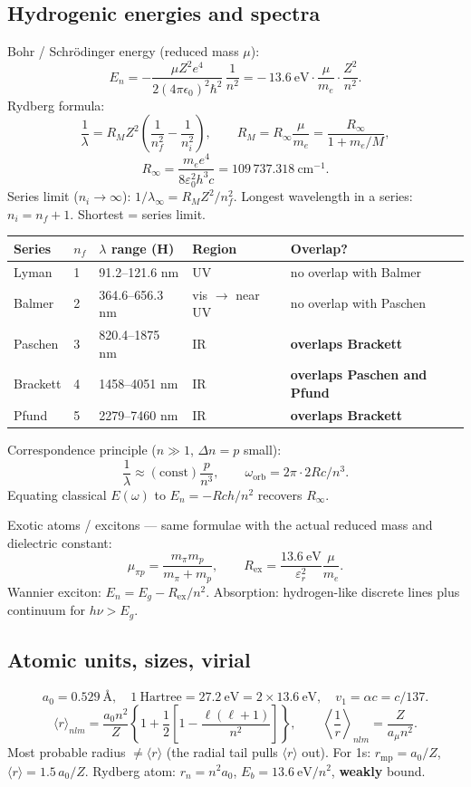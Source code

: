 \documentclass[11pt,a4paper]{article}
\begin{document}
\subsection{Hydrogenic energies and spectra}

Bohr / Schr\"odinger energy (reduced mass \(\mu\)):
\[
E_n = -\frac{\mu Z^2 e^4}{2(4\pi\epsilon_0)^2\hbar^2}\,\frac{1}{n^2}
= -\,13.6~\mathrm{eV}\cdot\frac{\mu}{m_e}\cdot\frac{Z^2}{n^2}.
\]
Rydberg formula:
\[
\frac{1}{\lambda} = R_M Z^2\left(\frac{1}{n_f^2}-\frac{1}{n_i^2}\right),\qquad
R_M = R_\infty\frac{\mu}{m_e} = \frac{R_\infty}{1+m_e/M},
\]
\[
R_\infty = \frac{m_e e^4}{8\varepsilon_0^2 h^3 c} = 109\,737.318~\mathrm{cm}^{-1}.
\]
Series limit (\(n_i\to\infty\)): \(1/\lambda_\infty = R_M Z^2/n_f^2\).
Longest wavelength in a series: \(n_i=n_f+1\). Shortest = series limit.

\begin{center}
\small
\begin{tabular}{@{}lllll@{}}
\toprule
Series & \(n_f\) & \(\lambda\) range (H) & Region & Overlap? \\
\midrule
Lyman    & 1 & 91.2--121.6 nm  & UV            & no overlap with Balmer \\
Balmer   & 2 & 364.6--656.3 nm & vis \(\to\) near UV & no overlap with Paschen \\
Paschen  & 3 & 820.4--1875 nm  & IR            & \textbf{overlaps Brackett} \\
Brackett & 4 & 1458--4051 nm   & IR            & \textbf{overlaps Paschen and Pfund} \\
Pfund  & 5 & 2279--7460 nm   & IR            & \textbf{overlaps Brackett} \\
\bottomrule
\end{tabular}
\end{center}

Correspondence principle (\(n\gg 1\), \(\Delta n=p\) small):
\[
\frac{1}{\lambda}\approx (\text{const})\frac{p}{n^3},\qquad
\omega_{\mathrm{orb}}=2\pi\cdot 2Rc/n^3.
\]
Equating classical \(E(\omega)\) to \(E_n=-Rch/n^2\) recovers \(R_\infty\).

Exotic atoms / excitons --- same formulae with the actual reduced mass and dielectric constant:
\[
\mu_{\pi p}=\frac{m_\pi m_p}{m_\pi+m_p},\qquad
R_{\mathrm{ex}}=\frac{13.6~\mathrm{eV}}{\varepsilon_r^2}\frac{\mu}{m_e}.
\]
Wannier exciton: \(E_n=E_g-R_{\mathrm{ex}}/n^2\). Absorption: hydrogen-like discrete lines plus continuum for \(h\nu>E_g\).

\subsection{Atomic units, sizes, virial}
\[
a_0=0.529~\text{\AA},\quad
1~\text{Hartree}=27.2~\mathrm{eV}=2\times 13.6~\mathrm{eV},\quad
v_1=\alpha c=c/137.
\]
\[
\langle r\rangle_{nlm}=\frac{a_0 n^2}{Z}\left\{1+\frac12\left[1-\frac{\ell(\ell+1)}{n^2}\right]\right\},
\qquad
\left\langle\frac1r\right\rangle_{nlm}=\frac{Z}{a_\mu n^2}.
\]
Most probable radius \(\neq\langle r\rangle\) (the radial tail pulls \(\langle r\rangle\) out).
For 1s: \(r_{\mathrm{mp}}=a_0/Z\), \(\langle r\rangle=1.5\,a_0/Z\).
Rydberg atom: \(r_n=n^2 a_0\), \(E_b=13.6~\mathrm{eV}/n^2\), \textbf{weakly} bound.
\end{document}
